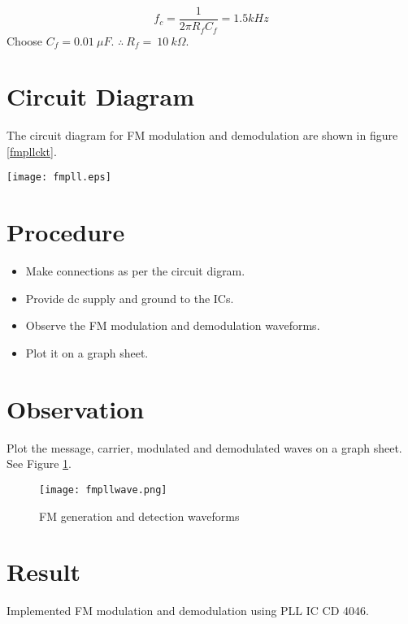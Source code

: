 \begin{equation}
f_c=\frac{1}{2\pi R_fC_f}=1.5kHz
\end{equation}
Choose $C_f=0.01\ \mu F$.  $\therefore \ R_f=\ 10 \ k\Omega$.
\section*{Circuit Diagram}

The circuit diagram for FM modulation and demodulation are shown in figure \ref{fmpllckt}.

\begin{sidewaysfigure}[ht]
    \texttt{[image: fmpll.eps]}
    \caption{Circuit for FM generation and detection using CD4046 PLL IC}
    \label{fmpllckt}
\end{sidewaysfigure}


\section*{Procedure}
\begin{itemize}
\item
Make connections as per the circuit digram.

\item
Provide dc supply and ground to the ICs.

\item
Observe the FM modulation and demodulation waveforms.

\item
Plot it on a graph sheet.
\end{itemize}
\section*{Observation}

Plot the message, carrier, modulated and demodulated waves on a graph sheet. See Figure \ref{fmpllwave}.
\begin{figure}
    \texttt{[image: fmpllwave.png]}
    \caption{FM generation and detection waveforms}
    \label{fmpllwave}
\end{figure}

\section*{Result}
Implemented FM modulation and demodulation using PLL IC CD 4046.